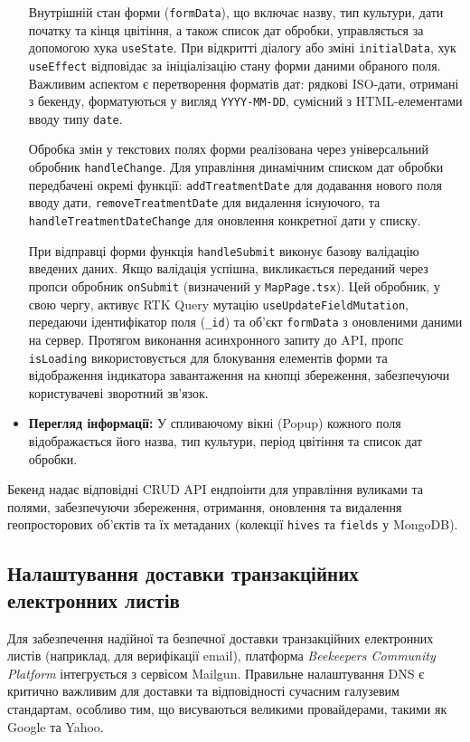 \begin{itemize}
    Внутрішній стан форми (\texttt{formData}), що включає назву, тип культури, дати початку та кінця цвітіння, а також список дат обробки, управляється за допомогою хука \texttt{useState}. При відкритті діалогу або зміні \texttt{initialData}, хук \texttt{useEffect} відповідає за ініціалізацію стану форми даними обраного поля. Важливим аспектом є перетворення форматів дат: рядкові ISO-дати, отримані з бекенду, форматуються у вигляд \texttt{YYYY-MM-DD}, сумісний з HTML-елементами вводу типу \texttt{date}.
    
    Обробка змін у текстових полях форми реалізована через універсальний обробник \texttt{handleChange}. Для управління динамічним списком дат обробки передбачені окремі функції: \texttt{addTreatmentDate} для додавання нового поля вводу дати, \texttt{removeTreatmentDate} для видалення існуючого, та \texttt{handleTreatmentDateChange} для оновлення конкретної дати у списку. 
    
    При відправці форми функція \texttt{handleSubmit} виконує базову валідацію введених даних. Якщо валідація успішна, викликається переданий через пропси обробник \texttt{onSubmit} (визначений у \texttt{MapPage.tsx}). Цей обробник, у свою чергу, активує RTK Query мутацію \texttt{useUpdateFieldMutation}, передаючи ідентифікатор поля (\texttt{\_id}) та об'єкт \texttt{formData} з оновленими даними на сервер. Протягом виконання асинхронного запиту до API, пропс \texttt{isLoading} використовується для блокування елементів форми та відображення індикатора завантаження на кнопці збереження, забезпечуючи користувачеві зворотний зв'язок.

    \item \textbf{Перегляд інформації:} У спливаючому вікні (Popup) кожного поля відображається його назва, тип культури, період цвітіння та список дат обробки.
\end{itemize}

Бекенд надає відповідні CRUD API ендпоінти для управління вуликами та полями, забезпечуючи збереження, отримання, оновлення та видалення геопросторових об'єктів та їх метаданих (колекції \texttt{hives} та \texttt{fields} у MongoDB).

\subsection{Налаштування доставки транзакційних електронних листів}
\label{subsec:email_delivery}

Для забезпечення надійної та безпечної доставки транзакційних електронних листів (наприклад, для верифікації email), платформа \textit{Beekeepers Community Platform} інтегрується з сервісом Mailgun. Правильне налаштування DNS є критично важливим для доставки та відповідності сучасним галузевим стандартам, особливо тим, що висуваються великими провайдерами, такими як Google та Yahoo.

